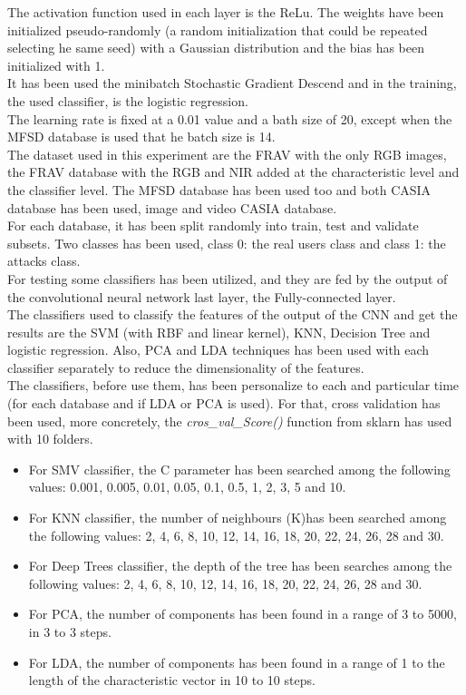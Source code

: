 The activation function used in each layer is the ReLu. The weights have been initialized pseudo-randomly (a random initialization that could be repeated selecting he same seed) with a Gaussian distribution and the bias has been initialized with 1.\\

It has been used the minibatch Stochastic Gradient Descend and in the training, the used classifier, is the logistic regression.\\

The learning rate is fixed at a 0.01 value and a bath size of 20, except when the MFSD database is used that he batch size is 14.\\

The dataset used in this experiment are the FRAV with the only RGB images, the FRAV database with the RGB and NIR added at the characteristic level  and  the classifier level. The MFSD database has been used too and both CASIA database has been used, image and video CASIA database.\\

For each database, it has been split randomly into train, test and validate subsets. Two classes has been used, class 0: the real users class and class 1: the attacks class.\\

For testing some classifiers has been utilized, and they are fed by the output of the convolutional neural network last layer, the Fully-connected layer.\\

The classifiers used to classify the features of the output of the CNN and get the results are the SVM (with RBF and linear kernel), KNN, Decision Tree and logistic regression. Also, PCA and LDA techniques has been used with each classifier separately to reduce the dimensionality of the features.\\

The classifiers, before use them, has been personalize to each and particular time (for each database and if LDA or PCA is used). For that, cross validation has been used, more concretely, the \textit{cros\_val\_Score()} function from sklarn has used with 10 folders.\\

\begin{itemize}
\item For SMV classifier, the C parameter has been searched among the following values: 0.001, 0.005, 0.01, 0.05, 0.1, 0.5, 1, 2, 3, 5 and 10.
\item For KNN classifier, the number of neighbours (K)has been searched among the following values: 2, 4, 6, 8, 10, 12, 14, 16, 18, 20, 22, 24, 26, 28 and 30.
\item For Deep Trees classifier, the depth of the tree has been searches among the following values: 2, 4, 6, 8, 10, 12, 14, 16, 18, 20, 22, 24, 26, 28 and 30.
\item For PCA, the number of components has been found in a range of 3 to 5000, in 3 to 3 steps.
\item For LDA, the number of components has been found in a range of 1 to the length of the characteristic vector in 10 to 10 steps.
\end{itemize}

